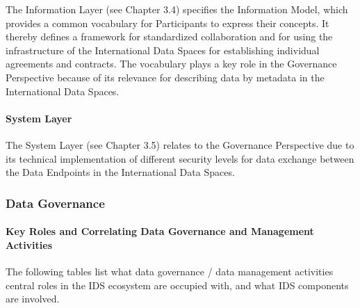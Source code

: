 The Information Layer (see Chapter 3.4) specifies the Information Model, which provides a common vocabulary for Participants to express their concepts. It thereby defines a framework for standardized collaboration and for using the infrastructure of the International Data Spaces for establishing individual agreements and contracts. The vocabulary plays a key role in the Governance Perspective because of its relevance for describing data by metadata in the International Data Spaces.

\paragraph{System Layer\\}

The System Layer (see Chapter 3.5) relates to the Governance Perspective due to its technical implementation of different security levels for data exchange between the Data Endpoints in the International Data Spaces.



\subsubsection{Data Governance}
\paragraph{Key Roles and Correlating Data Governance and Management Activities \\}

The following tables list what data governance / data management activities central roles in the IDS ecosystem are occupied with, and what IDS components are involved. 




